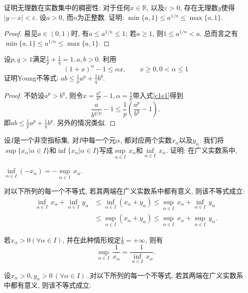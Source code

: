 \begin{quiza}
\begin{solution}
\end{solution}
\woe 证明无理数在实数集中的稠密性: 对于任何\(x\in \mathbb{R}\), 以及\(\varepsilon>0\), 存在无理数\(y\)使得\(|y-x|<\varepsilon\).
\woe 设\(a>0\), 而\(n\)为正整数. 证明: \(\min \{a,1\}\leqslant a^{1/n}\leqslant\max\{a,1\}\).
\begin{proof}
易见\(a\in (0,1)\)时, 有\(a\leqslant a^{1/n}\leqslant 1\); 若\(a\geqslant1\), 则\(1\leqslant a^{1/n}<a\). 总而言之有 \(\min \{a,1\}\leqslant a^{1/n}\leqslant\max\{a,1\}\).
\end{proof}
\woe 设\(p,q>1\)满足\(\frac{1}{p}+\frac{1}{q}=1,a,b>0\). 利用
\begin{equation}\label{c1e1}\tag{\(\heartsuit\)}
(1+x)^\alpha-1\leqslant \alpha x,\qquad x\geqslant 0,0<\alpha\leqslant1
\end{equation}
证明Young不等式: \(ab\leqslant\frac{1}{p}a^p+\frac{1}{q}b^q\).
\begin{proof}
不妨设\(a^p>b^q\), 则令\(x=\frac{a^p}{b^q}-1,\alpha=\frac{1}{p}\)带入式\eqref{c1e1}得到\[\frac{a}{b^{q/p}}-1\leqslant \frac{1}{p}\left(\frac{a^p}{b^q}-1\right),\]即\(ab\leqslant\frac{1}{p}a^p+\frac{1}{q}b^q\). 另外的情况类似.
\end{proof}
\woestar 设\(I\)是一个非空指标集, 对\(I\)中每一个元\(\alpha\), 都对应两个实数\(x_\alpha\)以及\(y_\alpha\). 我们将\(\sup\{x_\alpha|\alpha\in I\}\)和\(\inf\{x_\alpha|\alpha\in I\}\)写成\(\underset{\alpha\in I}{\sup}\,x_\alpha\)和\(\underset{\alpha\in I}{\inf}\,x_\alpha\). 证明: 在广义实数系中,
\begin{quizs}
 \item \(\underset{\alpha\in I}{\inf}(-x_\alpha)=-\underset{\alpha\in I}{\sup}\,x_\alpha\).
\item 对以下所列的每一个不等式, 若其两端在广义实数系中都有意义, 则该不等式成立:\[\begin{split}
\underset{\alpha\in I}{\inf}\,x_\alpha+\underset{\alpha\in I}{\inf}\,y_\alpha&\leqslant\underset{\alpha\in I}{\inf}(x_\alpha+y_\alpha)\leqslant\underset{\alpha\in I}{\sup}\,x_\alpha+\underset{\alpha\in I}{\inf}\,y_\alpha\\&\leqslant\underset{\alpha\in I}{\sup}(x_\alpha+y_\alpha)\leqslant\underset{\alpha\in I}{\sup}\,x_\alpha+\underset{\alpha\in I}{\sup}\,y_\alpha.\end{split}\]
\item 若\(x_\alpha>0(\forall \alpha\in I)\), 并在此种情形规定\(\frac{1}{0}=+\infty\), 则有\[ \underset{\alpha\in I}{\sup}\,\frac{1}{x_\alpha}=\frac{1}{\underset{\alpha\in I}{\inf}\,x_\alpha}.\]
\item 设\(x_\alpha>0,y_\alpha>0\,(\forall \alpha\in I)\). 对以下所列的每一个不等式, 若其两端在广义实数系中都有意义, 则该不等式成立: \[\begin{split}

\end{split}\]
\end{quizs}
\end{quiza}
